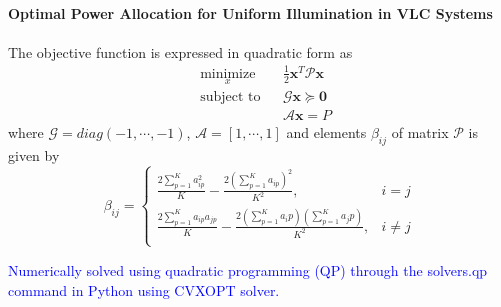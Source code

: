 \documentclass[slidestop,usepdftitle=false]{gvvslides}
\providecommand{\sbrak}[1]{\ensuremath{{}\left[#1\right]}}
\providecommand{\brak}[1]{\ensuremath{\left(#1\right)}}
\begin{document}
\begin{frame}
\frametitle{\,}
\framesubtitle{Optimal Power Allocation for Uniform Illumination in VLC Systems}
\begin{list}{}{}
\vfill
\item<1-> The objective function is expressed in quadratic form as
\begin{equation}
\label{var_obj}
\begin{aligned}
& \underset{x}{\text{minimize}}
& & \frac{1}{2}\textbf{x}^T\mathcal{P}\textbf{x}\\
& \text{subject to}
& & \mathcal{G}\textbf{x} \succeq \textbf{0}\\
& & &\mathcal{A}\textbf{x}=P
\end{aligned}\nonumber
\end{equation}
where $\mathcal{G}=diag\brak{-1,\cdots,-1}$, $\mathcal{A}=\sbrak{1,\cdots,1}$ and elements $\beta_{ij}$ of matrix $\mathcal{P}$ is given by
\begin{equation}
\beta_{ij}=
\begin{cases}
\frac{2\sum_{p=1}^Ka_{ip}^2}{K}-\frac{2\brak{\sum_{p=1}^Ka_{ip}}^2}{K^2}, & i=j\\
\frac{2\sum_{p=1}^Ka_{ip}a_{jp}}{K}-\frac{2\brak{\sum_{p=1}^Ka_ip}\brak{\sum_{p=1}^Ka_jp}}{K^2}, & i \neq j\\
\end{cases}\nonumber
\end{equation}
\vfill
\item<2>
\textcolor{blue}{ Numerically solved using quadratic programming (QP)
through the solvers.qp command in Python using CVXOPT solver.}
\vfill
\end{list} 
\end{frame}
\end{document}
